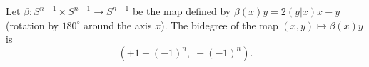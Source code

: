Let $\beta: S^{n-1} \times S^{n-1} \to S^{n-1}$ be the map defined by $\beta(x)y = 2(y|x)x - y$ (rotation by $180^\circ$ around the axis $x$). The bidegree of the map $(x, y) \mapsto \beta(x)y$ is
$$(+1 + (-1)^n, \; -(-1)^n).$$

